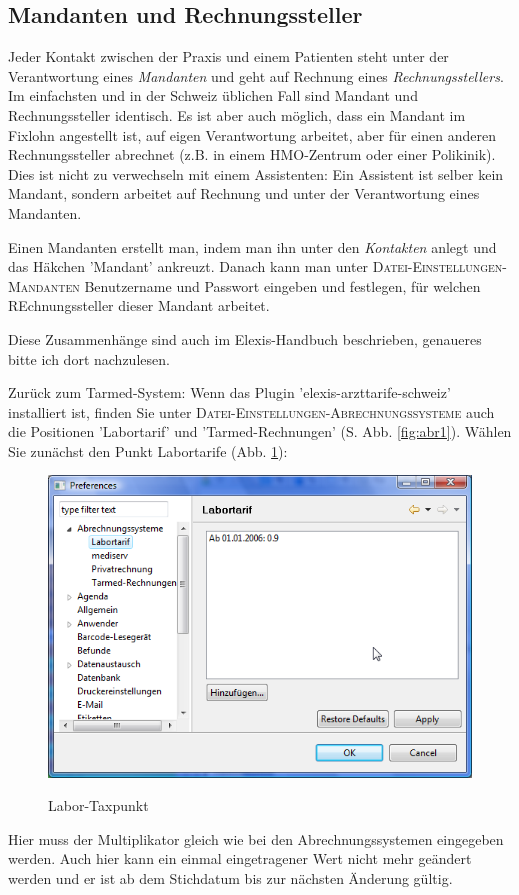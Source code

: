 \documentclass[a4paper]{scrartcl}
\begin{document}
\subsection{Mandanten und Rechnungssteller}

Jeder Kontakt zwischen der Praxis und einem Patienten steht unter der Verantwortung eines \textit{Mandanten} und geht auf Rechnung eines \textit{Rechnungsstellers}. Im einfachsten und in der Schweiz üblichen Fall sind Mandant und Rechnungssteller identisch. Es ist aber auch möglich, dass ein Mandant im Fixlohn angestellt ist, auf eigen Verantwortung arbeitet, aber für einen anderen Rechnungssteller abrechnet (z.B. in einem HMO-Zentrum oder einer Polikinik). Dies ist nicht zu verwechseln mit einem Assistenten: Ein Assistent ist selber kein Mandant, sondern arbeitet auf Rechnung und unter der Verantwortung eines Mandanten.

\medskip

Einen Mandanten erstellt man, indem man ihn unter den \textit{Kontakten} anlegt und das Häkchen 'Mandant' ankreuzt. Danach kann man unter \textsc{Datei-Einstellungen-Mandanten} Benutzername und Passwort eingeben und festlegen, für welchen REchnungssteller dieser Mandant arbeitet.

Diese Zusammenhänge sind auch im Elexis-Handbuch beschrieben, genaueres bitte ich dort nachzulesen.

\medskip

Zurück zum Tarmed-System: Wenn das Plugin 'elexis-arzttarife-schweiz' installiert ist, finden Sie unter \textsc{Datei-Einstellungen-Abrechnungssysteme} auch die Positionen 'Labortarif' und 'Tarmed-Rechnungen' (S. Abb. \ref{fig:abr1}). Wählen Sie zunächst den Punkt Labortarife (Abb. \ref{fig:abr3}):
\begin{figure}
  \includegraphics{abr3}\\
  \caption{Labor-Taxpunkt}\label{fig:abr3}
\end{figure}
Hier muss der Multiplikator gleich wie bei den Abrechnungssystemen eingegeben werden. Auch hier kann ein einmal eingetragener Wert nicht mehr geändert werden und er ist ab dem Stichdatum bis zur nächsten Änderung gültig.
\end{document}
